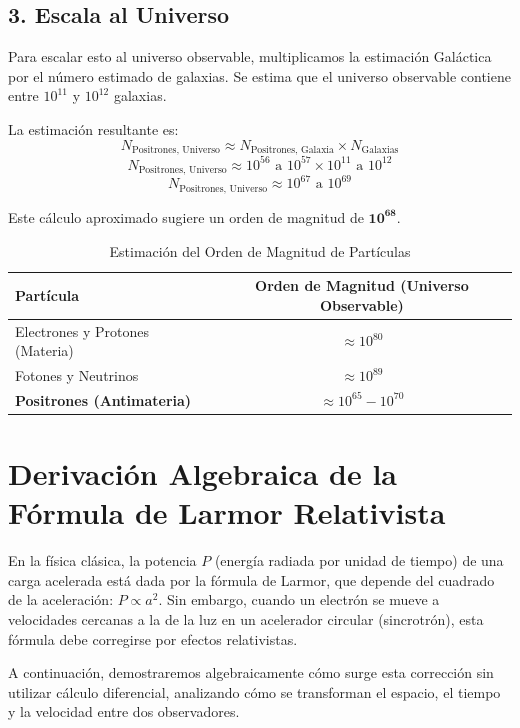 \documentclass[11pt,a4paper]{book}
\begin{document}
\subsection*{3. Escala al Universo}

Para escalar esto al universo observable, multiplicamos la estimación Galáctica por el número estimado de galaxias. Se estima que el universo observable contiene entre $10^{11}$ y $10^{12}$ galaxias.

La estimación resultante es:
$$N_{\text{Positrones, Universo}} \approx N_{\text{Positrones, Galaxia}} \times N_{\text{Galaxias}}$$
$$N_{\text{Positrones, Universo}} \approx 10^{56} \text{ a } 10^{57} \times 10^{11} \text{ a } 10^{12}$$
$$N_{\text{Positrones, Universo}} \approx 10^{67} \text{ a } 10^{69}$$

Este cálculo aproximado sugiere un orden de magnitud de $\mathbf{10^{68}}$.

\begin{table}[h!]
    \centering
    \begin{tabular}{|l|c|}
        \hline
        \textbf{Partícula} & \textbf{Orden de Magnitud (Universo Observable)} \\
        \hline
        Electrones y Protones (Materia) & $\approx 10^{80}$ \\
        \hline
        Fotones y Neutrinos & $\approx 10^{89}$ \\
        \hline
        \textbf{Positrones (Antimateria)} & $\approx 10^{65} - 10^{70}$ \\
        \hline
    \end{tabular}
    \caption{Estimación del Orden de Magnitud de Partículas}
\end{table}

\section{Derivación Algebraica de la Fórmula de Larmor Relativista}
\label{sec:larmorrel}

En la física clásica, la potencia $P$ (energía radiada por unidad de tiempo) de una carga acelerada está dada por la fórmula de Larmor, que depende del cuadrado de la aceleración: $P \propto a^2$. Sin embargo, cuando un electrón se mueve a velocidades cercanas a la de la luz en un acelerador circular (sincrotrón), esta fórmula debe corregirse por efectos relativistas. 

A continuación, demostraremos algebraicamente cómo surge esta corrección sin utilizar cálculo diferencial, analizando cómo se transforman el espacio, el tiempo y la velocidad entre dos observadores.
\end{document}

